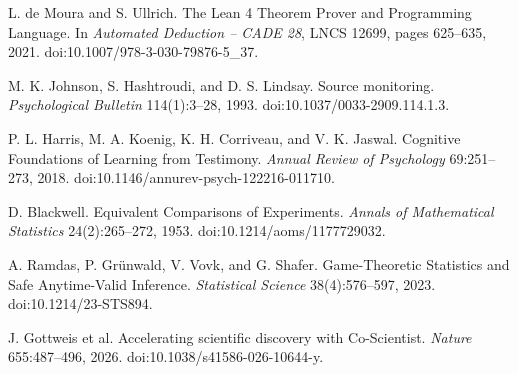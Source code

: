  L. de Moura and S. Ullrich. The Lean 4 Theorem Prover and Programming Language. In \emph{Automated Deduction -- CADE 28}, LNCS 12699, pages 625--635, 2021. doi:10.1007/978-3-030-79876-5\_37.

 M. K. Johnson, S. Hashtroudi, and D. S. Lindsay. Source monitoring. \emph{Psychological Bulletin} 114(1):3--28, 1993. doi:10.1037/0033-2909.114.1.3.

 P. L. Harris, M. A. Koenig, K. H. Corriveau, and V. K. Jaswal. Cognitive Foundations of Learning from Testimony. \emph{Annual Review of Psychology} 69:251--273, 2018. doi:10.1146/annurev-psych-122216-011710.

 D. Blackwell. Equivalent Comparisons of Experiments. \emph{Annals of Mathematical Statistics} 24(2):265--272, 1953. doi:10.1214/aoms/1177729032.

 A. Ramdas, P. Gr\"unwald, V. Vovk, and G. Shafer. Game-Theoretic Statistics and Safe Anytime-Valid Inference. \emph{Statistical Science} 38(4):576--597, 2023. doi:10.1214/23-STS894.

 J. Gottweis et al. Accelerating scientific discovery with Co-Scientist. \emph{Nature} 655:487--496, 2026. doi:10.1038/s41586-026-10644-y.
